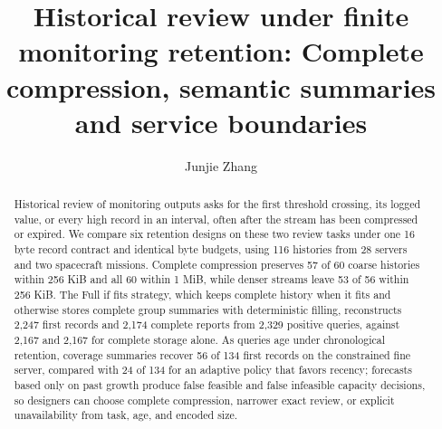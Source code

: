 \documentclass[a4paper,fleqn]{cas-dc}
\begin{document}
\let\WriteBookmarks\relax
\def\floatpagepagefraction{1}
\def\textpagefraction{.001}


\title[mode = title]{Historical review under finite monitoring retention: Complete compression, semantic summaries and service boundaries}


\author[1]{Junjie Zhang}
\cormark[1]



\begin{abstract}
Historical review of monitoring outputs asks for the first threshold crossing, its logged value, or every high record in an interval, often after the stream has been compressed or expired. We compare six retention designs on these two review tasks under one 16 byte record contract and identical byte budgets, using 116 histories from 28 servers and two spacecraft missions. Complete compression preserves 57 of 60 coarse histories within 256 KiB and all 60 within 1 MiB, while denser streams leave 53 of 56 within 256 KiB. The Full if fits strategy, which keeps complete history when it fits and otherwise stores complete group summaries with deterministic filling, reconstructs 2,247 first records and 2,174 complete reports from 2,329 positive queries, against 2,167 and 2,167 for complete storage alone. As queries age under chronological retention, coverage summaries recover 56 of 134 first records on the constrained fine server, compared with 24 of 134 for an adaptive policy that favors recency; forecasts based only on past growth produce false feasible and false infeasible capacity decisions, so designers can choose complete compression, narrower exact review, or explicit unavailability from task, age, and encoded size.
\end{abstract}
\end{document}
